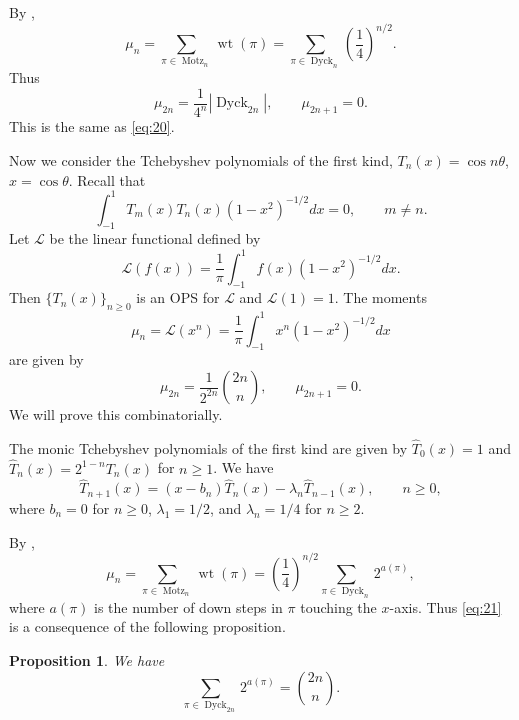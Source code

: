 \documentclass[oneside]{book}
\numberwithin{equation}{section}
\newtheorem{prop}[thm]{Proposition}
\theoremstyle{definition}
\newcommand\Motz{\operatorname{Motz}}
\newcommand\LL{\mathcal{L}}
\newcommand{\Dyck}{\operatorname{Dyck}}
\newcommand\wt{\operatorname{wt}}
\begin{document}
  By ,
  \[
    \mu_n = \sum_{\pi\in \Motz_n} \wt(\pi)
    = \sum_{\pi\in \Dyck_n} \left( \frac{1}{4} \right)^{n/2}.
  \]
  Thus
  \[
    \mu_{2n} = \frac{1}{4^n} |\Dyck_{2n}|, \qquad \mu_{2n+1} = 0.
  \]
  This is the same as \eqref{eq:20}.

  \medskip

  Now we consider the Tchebyshev polynomials of the first kind,
  \( T_n(x) = \cos n\theta \), \( x=\cos \theta \). Recall that
\[
  \int_{-1}^1 T_m(x)T_n(x) (1-x^2)^{-1/2} dx = 0, \qquad m\ne n.
\]
  Let \( \LL \) be the linear functional defined by
  \[
    \LL(f(x)) = \frac{1}{\pi} \int_{-1}^1 f(x) (1-x^2)^{-1/2} dx.
  \]
  Then \( \{T_n(x)\}_{n\ge0} \) is an OPS for \( \LL \) and
  \( \LL(1) = 1 \). The moments
  \[
    \mu_n= \LL(x^n) = \frac{1}{\pi} \int_{-1}^1 x^n (1-x^2)^{-1/2} dx
  \]
  are given by
  \begin{equation}\label{eq:21}
    \mu_{2n} = \frac{1}{2^{2n}} \binom{2n}{n}, \qquad
    \mu_{2n+1} = 0.
  \end{equation}
  We will prove this combinatorially.

  The monic Tchebyshev polynomials of the first kind are given by
  \( \hat{T}_0(x) = 1 \) and \( \hat{T}_n(x) = 2^{1-n}T_n(x) \) for
  \( n\ge1 \). We have
  \[
      \hat{T}_{n+1}(x) = (x-b_n) \hat{T}_n(x) - \lambda_n\hat{T}_{n-1}(x),
      \qquad n\ge0,
  \]
  where \( b_n=0 \) for \( n\ge0 \), \( \lambda_1 = 1/2 \), and
  \( \lambda_n = 1/4 \) for \( n\ge2 \).


  By ,
  \[
    \mu_n = \sum_{\pi\in \Motz_n} \wt(\pi)
    = \left( \frac{1}{4} \right)^{n/2} \sum_{\pi\in \Dyck_n} 2^{a(\pi)},
  \]
  where \( a(\pi) \) is the number of down steps in \( \pi \) touching
  the \( x \)-axis. Thus \eqref{eq:21} is a consequence of the
  following proposition.

  \begin{prop}
    We have
    \begin{equation}\label{eq:22}
     \sum_{\pi\in \Dyck_{2n}} 2^{a(\pi)} = \binom{2n}{n}.
   \end{equation}
  \end{prop}
\end{document}
